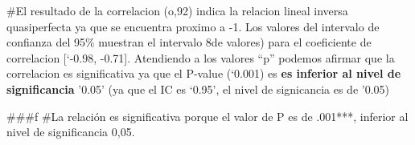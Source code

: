 \documentclass[
]{article}
\begin{document}
\#El resultado de la correlacion (o,92) indica la relacion lineal
inversa quasiperfecta ya que se encuentra proximo a -1. Los valores del
intervalo de confianza del 95\% muestran el intervalo 8de valores) para
el coeficiente de correlacion {[}`-0.98, -0.71{]}. Atendiendo a los
valores ``p'' podemos afirmar que la correlacion es significativa ya que
el P-value (`0.001) es \textbf{es inferior al nivel de significancia}
'0.05' (ya que el IC es `0.95', el nivel de signicancia es de '0.05)

\#\#\#f \#La relación es significativa porque el valor de P es de
.001***, inferior al nivel de significancia 0,05.
\end{document}
